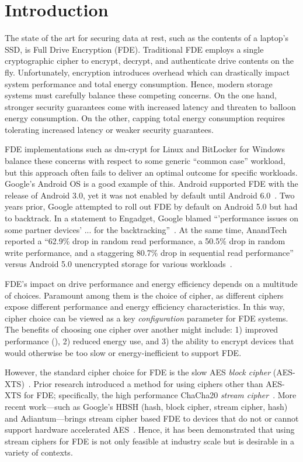 \section{Introduction}\label{sec:introduction}

The state of the art for securing data at rest, such as the contents of a
laptop's SSD, is Full Drive Encryption (FDE). Traditional FDE employs a single
cryptographic cipher to encrypt, decrypt, and authenticate drive contents on the
fly. Unfortunately, encryption introduces overhead which can drastically impact
system performance and total energy consumption. Hence, modern storage systems
must carefully balance these competing concerns. On the one hand, stronger
security guarantees come with increased latency and threaten to balloon energy
consumption. On the other, capping total energy consumption requires tolerating
increased latency or weaker security guarantees.

FDE implementations such as dm-crypt for Linux and BitLocker for Windows balance
these concerns with respect to some generic ``common case'' workload, but
this approach often fails to deliver an optimal outcome for specific workloads.
Google's Android OS is a good example of this. Android supported FDE with the
release of Android 3.0, yet it was not enabled by default until Android
6.0~\cite{android-M-mobile-motivation}. Two years prior, Google attempted to
roll out FDE by default on Android 5.0 but had to backtrack. In a statement to
Engadget, Google blamed ``'performance issues on some partner devices' ... for
the backtracking''~\cite{google-engadget}. At the same time, AnandTech reported
a ``62.9\% drop in random read performance, a 50.5\% drop in random write
performance, and a staggering 80.7\% drop in sequential read performance''
versus Android 5.0 unencrypted storage for various
workloads~\cite{android-M-mobile-motivation-2}.

FDE's impact on drive performance and energy efficiency depends on a multitude
of choices. Paramount among them is the choice of cipher, as different ciphers
expose different performance and energy efficiency characteristics. In this way,
cipher choice can be viewed as a key \emph{configuration} parameter for FDE
systems. The benefits of choosing one cipher over another might include: 1)
improved performance (), 2) reduced energy
use, and 3) the ability to encrypt devices that would otherwise be too slow or
energy-inefficient to support FDE.

However, the standard cipher choice for FDE is the slow AES \emph{block cipher}
(AES-XTS)~\cite{XTS, XTSComments, NISTXTS}. Prior research introduced a method
for using ciphers other than AES-XTS for FDE; specifically, the high performance
ChaCha20 \emph{stream cipher}~\cite{StrongBox, ChaCha20}. More recent
work---such as Google's HBSH (hash, block cipher, stream cipher, hash) and
Adiantum---brings stream cipher based FDE to devices that do not or cannot
support hardware accelerated AES~\cite{Adiantum}. Hence, it has been
demonstrated that using stream ciphers for FDE is not only feasible at industry
scale but is desirable in a variety of contexts.

